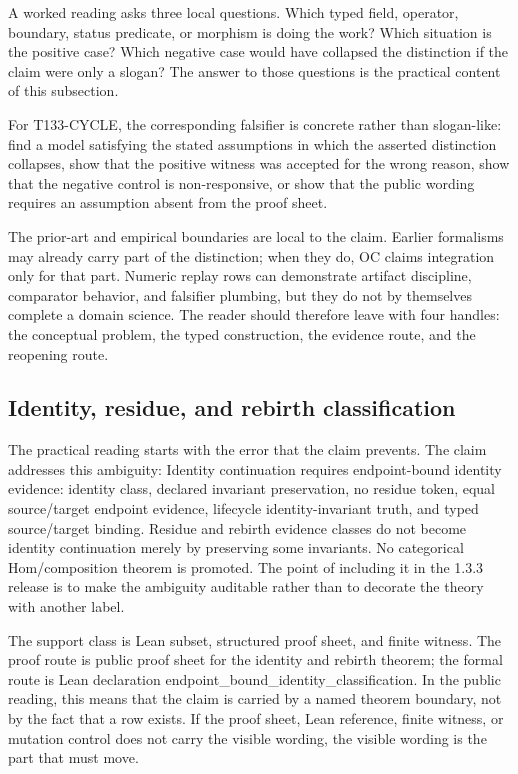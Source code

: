 A worked reading asks three local questions. Which typed field, operator, boundary, status predicate, or morphism is doing the work? Which situation is the positive case? Which negative case would have collapsed the distinction if the claim were only a slogan? The answer to those questions is the practical content of this subsection.

For T133-CYCLE, the corresponding falsifier is concrete rather than slogan-like: find a model satisfying the stated assumptions in which the asserted distinction collapses, show that the positive witness was accepted for the wrong reason, show that the negative control is non-responsive, or show that the public wording requires an assumption absent from the proof sheet.

The prior-art and empirical boundaries are local to the claim. Earlier formalisms may already carry part of the distinction; when they do, OC claims integration only for that part. Numeric replay rows can demonstrate artifact discipline, comparator behavior, and falsifier plumbing, but they do not by themselves complete a domain science. The reader should therefore leave with four handles: the conceptual problem, the typed construction, the evidence route, and the reopening route.

\subsection{Identity, residue, and rebirth classification}
The practical reading starts with the error that the claim prevents. The claim addresses this ambiguity: Identity continuation requires endpoint-bound identity evidence: identity class, declared invariant preservation, no residue token, equal source/target endpoint evidence, lifecycle identity-invariant truth, and typed source/target binding. Residue and rebirth evidence classes do not become identity continuation merely by preserving some invariants. No categorical Hom/composition theorem is promoted. The point of including it in the 1.3.3 release is to make the ambiguity auditable rather than to decorate the theory with another label.

The support class is Lean subset, structured proof sheet, and finite witness. The proof route is public proof sheet for the identity and rebirth theorem; the formal route is Lean declaration endpoint\_bound\_identity\_classification. In the public reading, this means that the claim is carried by a named theorem boundary, not by the fact that a row exists. If the proof sheet, Lean reference, finite witness, or mutation control does not carry the visible wording, the visible wording is the part that must move.

